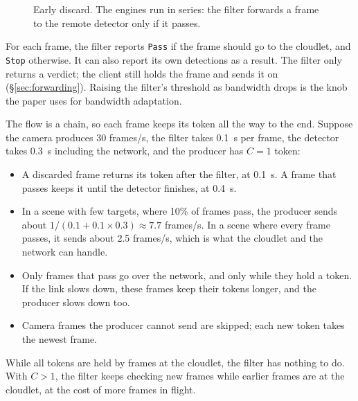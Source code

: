 \documentclass[11pt]{article}
\newcommand{\code}[1]{\texttt{#1}}
\begin{document}
\begin{figure}[h]
\centering
{}
\caption{Early discard. The engines run in series: the filter forwards a frame
to the remote detector only if it passes.}
\label{fig:early-discard}
\end{figure}

For each frame, the filter reports \code{Pass} if the frame should go to the
cloudlet, and \code{Stop} otherwise. It can also report its own detections as
a result. The filter only returns a verdict; the client still holds the frame
and sends it on (\S\ref{sec:forwarding}). Raising the filter's threshold as
bandwidth drops is the knob the paper uses for bandwidth adaptation.

The flow is a chain, so each frame keeps its token all the way to the end.
Suppose the camera produces 30 frames/s, the filter takes 0.1~s per frame, the
detector takes 0.3~s including the network, and the producer has $C = 1$
token:
\begin{itemize}[nosep]
  \item A discarded frame returns its token after the filter, at 0.1~s. A
        frame that passes keeps it until the detector finishes, at 0.4~s.
  \item In a scene with few targets, where 10\% of frames pass, the producer
        sends about $1/(0.1 + 0.1 \times 0.3) \approx 7.7$ frames/s. In a scene
        where every frame passes, it sends about 2.5 frames/s, which is what
        the cloudlet and the network can handle.
  \item Only frames that pass go over the network, and only while they hold
        a token. If the link slows down, these frames keep their tokens
        longer, and the producer slows down too.
  \item Camera frames the producer cannot send are skipped; each new token
        takes the newest frame.
\end{itemize}
While all tokens are held by frames at the cloudlet, the filter has nothing to
do. With $C > 1$, the filter keeps checking new frames while earlier frames are
at the cloudlet, at the cost of more frames in flight.
\end{document}
